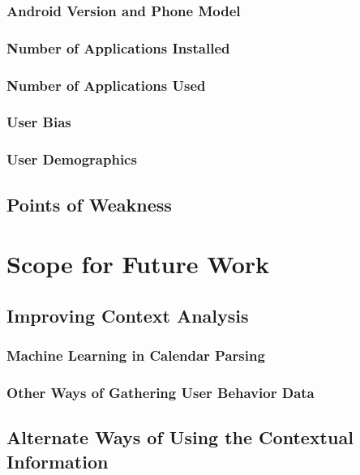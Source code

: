 \documentclass[12pt]{uthesis-v12}  %
\begin{document}
		\subsection{Android Version and Phone Model}
		
		\subsection{Number of Applications Installed}
		
		\subsection{Number of Applications Used}
		
		\subsection{User Bias}
		
		\subsection{User Demographics}
	
	\section{Points of Weakness}		

\chapter{Scope for Future Work}
		
	\section{Improving Context Analysis}
		
		\subsection{Machine Learning in Calendar Parsing}
		
		\subsection{Other Ways of Gathering User Behavior Data}
		
	\section{Alternate Ways of Using the Contextual Information}
			
\end{document}
